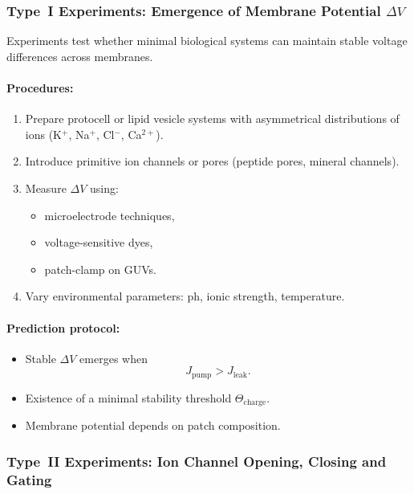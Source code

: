 \subsubsection{Type~I Experiments: Emergence of Membrane Potential \texorpdfstring{$\Delta V$}{ΔV}}

Experiments test whether minimal biological systems can maintain 
stable voltage differences across membranes.

\paragraph{Procedures:}

\begin{enumerate}
    \item Prepare protocell or lipid vesicle systems with asymmetrical 
          distributions of ions (K$^+$, Na$^+$, Cl$^-$, Ca$^{2+}$).
    \item Introduce primitive ion channels or pores (peptide pores, mineral channels).
    \item Measure $\Delta V$ using:
          \begin{itemize}
              \item microelectrode techniques,
              \item voltage-sensitive dyes,
              \item patch-clamp on GUVs.
          \end{itemize}
    \item Vary environmental parameters: ph, ionic strength, temperature.
\end{enumerate}

\paragraph{Prediction protocol:}

\begin{itemize}
    \item Stable $\Delta V$ emerges when 
          \[
              J_{\mathrm{pump}} > J_{\mathrm{leak}}.
          \]
    \item Existence of a minimal stability threshold $\Theta_{\mathrm{charge}}$.
    \item Membrane potential depends on patch composition.
\end{itemize}



\subsubsection{Type~II Experiments: Ion Channel Opening, Closing and Gating}

